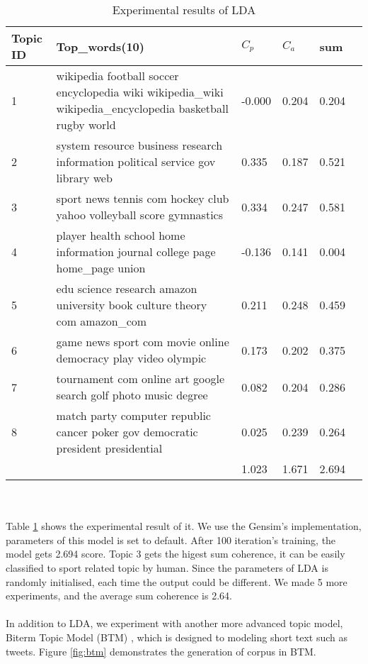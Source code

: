 \begin{table}[!htbp]
    \centering
    \hspace{0.5cm}
    \begin{tabular}{|p{45pt}|p{210pt}|p{30pt}|p{30pt}|p{30pt}|p{30pt}|}
        \hline
        Topic ID & Top\_words(10) & $C_p$ & $C_a$ & sum\\ \hline
        1 & wikipedia football soccer encyclopedia wiki wikipedia\_wiki wikipedia\_encyclopedia basketball rugby world & -0.000 & 0.204 & 0.204\\\hline
        2 & system resource business research information political service gov library web & 0.335 & 0.187 & 0.521\\\hline
        3 & sport news tennis com hockey club yahoo volleyball score gymnastics & 0.334 & 0.247 & 0.581\\\hline
        4 & player health school home information journal college page home\_page union & -0.136 & 0.141 & 0.004\\\hline
        5 & edu science research amazon university book culture theory com amazon\_com & 0.211 & 0.248 & 0.459\\\hline
        6 & game news sport com movie online democracy play video olympic & 0.173 & 0.202 & 0.375\\\hline
        7 & tournament com online art google search golf photo music degree & 0.082 & 0.204 & 0.286\\\hline
        8 & match party computer republic cancer poker gov democratic president presidential & 0.025 & 0.239 & 0.264\\\hline
        & & 1.023 & 1.671 & 2.694\\\hline
    \end{tabular}
    \caption{Experimental results of LDA}
    \label{tab:LDA1}
\end{table}
\\\\Table \ref{tab:LDA1} shows the experimental result of it. We use the Gensim's implementation, parameters of this model is set to default. After 100 iteration's training, the model gets 2.694 score. Topic 3 gets the higest sum coherence, it can be easily classified to sport related topic by human. Since the parameters of LDA is randomly
initialised, each time the output could be different. We made 5 more experiments, and the average sum coherence is 2.64.
\\\\In addition to LDA, we experiment with another more advanced topic model, Biterm Topic Model (BTM) \cite{yan2013biterm, cheng2014btm}, which is designed to modeling short text such as tweets. Figure \ref{fig:btm} demonstrates the generation of corpus in BTM.
